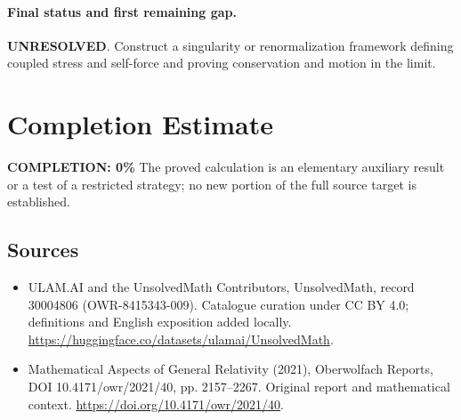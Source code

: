 \documentclass[11pt]{article}
\begin{document}
\paragraph{Final status and first remaining gap.}
\textbf{UNRESOLVED}. Construct a singularity or renormalization framework defining coupled stress and self-force and proving conservation and motion in the limit.

\section{Completion Estimate}
\noindent\textbf{COMPLETION: 0\%}
The proved calculation is an elementary auxiliary result or a test of a restricted strategy; no new portion of the full source target is established.

\subsection{Sources}
\begin{itemize}
\item[\hypertarget{source:30004806:1}{S1}] ULAM.AI and the UnsolvedMath Contributors, UnsolvedMath, record 30004806 (OWR-8415343-009). Catalogue curation under CC BY 4.0; definitions and English exposition added locally.
\url{https://huggingface.co/datasets/ulamai/UnsolvedMath}.
\item[\hypertarget{source:30004806:2}{S2}] Mathematical Aspects of General Relativity (2021), Oberwolfach Reports, DOI 10.4171/owr/2021/40, pp. 2157--2267. Original report and mathematical context.
\url{https://doi.org/10.4171/owr/2021/40}.
\end{itemize}
\label{end:30004806}
\end{document}
